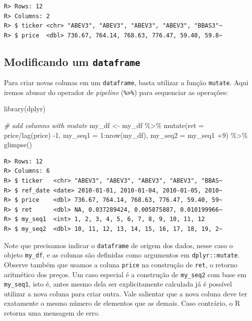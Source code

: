 \documentclass[
  11pt,
]{book}
\newenvironment{Shaded}{\begin{snugshade}}{\end{snugshade}}
\newcommand{\AttributeTok}[1]{\textcolor[rgb]{0.61,0.61,0.61}{#1}}
\newcommand{\CommentTok}[1]{\textcolor[rgb]{0.37,0.37,0.37}{\textit{#1}}}
\newcommand{\DecValTok}[1]{\textcolor[rgb]{0.06,0.06,0.06}{#1}}
\newcommand{\FunctionTok}[1]{\textcolor[rgb]{0,0,0}{#1}}
\newcommand{\NormalTok}[1]{#1}
\newcommand{\OtherTok}[1]{\textcolor[rgb]{0.37,0.37,0.37}{#1}}
\newcommand{\SpecialCharTok}[1]{\textcolor[rgb]{0,0,0}{#1}}
\begin{document}
\begin{verbatim}
R> Rows: 12
R> Columns: 2
R> $ ticker <chr> "ABEV3", "ABEV3", "ABEV3", "ABEV3", "BBAS3"~
R> $ price  <dbl> 736.67, 764.14, 768.63, 776.47, 59.40, 59.8~
\end{verbatim}

\hypertarget{modificando-um-dataframe}{%
\subsection{\texorpdfstring{Modificando um \texttt{dataframe}}{Modificando um dataframe}}\label{modificando-um-dataframe}}

Para criar novas colunas em um \texttt{dataframe}, basta utilizar a função \texttt{mutate}. Aqui iremos abusar do operador de \emph{pipeline} (\texttt{\%\textgreater{}\%}) para sequenciar as operações:

\begin{Shaded}
\begin{Highlighting}[]
\FunctionTok{library}\NormalTok{(dplyr)}

\CommentTok{\# add columns with mutate}
\NormalTok{my\_df }\OtherTok{\textless{}{-}}\NormalTok{ my\_df }\SpecialCharTok{\%\textgreater{}\%}
  \FunctionTok{mutate}\NormalTok{(}\AttributeTok{ret =}\NormalTok{ price}\SpecialCharTok{/}\FunctionTok{lag}\NormalTok{(price) }\SpecialCharTok{{-}}\DecValTok{1}\NormalTok{,}
         \AttributeTok{my\_seq1 =} \DecValTok{1}\SpecialCharTok{:}\FunctionTok{nrow}\NormalTok{(my\_df),}
         \AttributeTok{my\_seq2 =}\NormalTok{  my\_seq1 }\SpecialCharTok{+}\DecValTok{9}\NormalTok{) }\SpecialCharTok{\%\textgreater{}\%}
  \FunctionTok{glimpse}\NormalTok{()}
\end{Highlighting}
\end{Shaded}

\begin{verbatim}
R> Rows: 12
R> Columns: 6
R> $ ticker   <chr> "ABEV3", "ABEV3", "ABEV3", "ABEV3", "BBAS~
R> $ ref_date <date> 2010-01-01, 2010-01-04, 2010-01-05, 2010~
R> $ price    <dbl> 736.67, 764.14, 768.63, 776.47, 59.40, 59~
R> $ ret      <dbl> NA, 0.037289424, 0.005875887, 0.010199966~
R> $ my_seq1  <int> 1, 2, 3, 4, 5, 6, 7, 8, 9, 10, 11, 12
R> $ my_seq2  <dbl> 10, 11, 12, 13, 14, 15, 16, 17, 18, 19, 2~
\end{verbatim}

Note que precisamos indicar o \texttt{dataframe} de origem dos dados, nesse caso o objeto \texttt{my\_df}, e as colunas são definidas como argumentos em \texttt{dplyr::mutate}. Observe também que usamos a coluna \texttt{price} na construção de \texttt{ret}, o retorno aritmético dos preços. Um caso especial é a construção de \texttt{my\_seq2} com base em \texttt{my\_seq1}, isto é, antes mesmo dela ser explicitamente calculada já é possível utilizar a nova coluna para criar outra. Vale salientar que a nova coluna deve ter exatamente o mesmo número de elementos que as demais. Caso contrário, o R retorna uma mensagem de erro.
\end{document}
